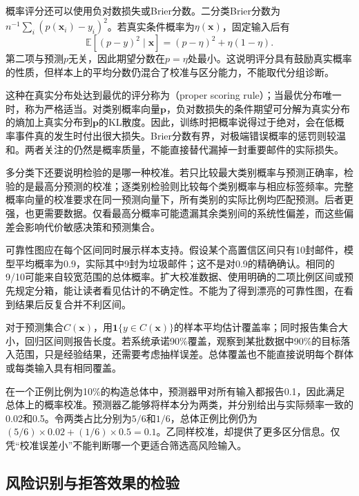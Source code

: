 概率评分还可以使用负对数损失或Brier分数。二分类Brier分数为$n^{-1}\sum_i(p(\bm{x}_i)-y_i)^2$。若真实条件概率为$\eta(\bm{x})$，固定输入后有
\[
 \mathbb E[(p-y)^2\mid\bm{x}]
 =(p-\eta)^2+\eta(1-\eta).
\]
第二项与预测$p$无关，因此期望分数在$p=\eta$处最小。这说明评分具有鼓励真实概率的性质，但样本上的平均分数仍混合了校准与区分能力，不能取代分组诊断。

这种在真实分布处达到最优的评分称为（proper scoring rule）；当最优分布唯一时，称为严格适当。对类别概率向量$\bm p$，负对数损失的条件期望可分解为真实分布的熵加上真实分布到$\bm p$的KL散度。因此，训练时把概率说得过于绝对，会在低概率事件真的发生时付出很大损失。Brier分数有界，对极端错误概率的惩罚则较温和。两者关注的仍然是概率质量，不能直接替代漏掉一封重要邮件的实际损失。

多分类下还要说明检验的是哪一种校准。若只比较最大类别概率与预测正确率，检验的是最高分预测的校准；逐类别检验则比较每个类别概率与相应标签频率。完整概率向量的校准要求在同一预测向量下，所有类别的实际比例均匹配预测。后者更强，也更需要数据。仅看最高分概率可能遗漏其余类别间的系统性偏差，而这些偏差会影响代价敏感决策和预测集合。

可靠性图应在每个区间同时展示样本支持。假设某个高置信区间只有10封邮件，模型平均概率为0.9，实际其中9封为垃圾邮件；这不是对0.9的精确确认。相同的9/10可能来自较宽范围的总体概率。扩大校准数据、使用明确的二项比例区间或预先规定分箱，能让读者看见估计的不确定性。不能为了得到漂亮的可靠性图，在看到结果后反复合并不利区间。

对于预测集合$C(\bm{x})$，用$\mathbf 1\{y\in C(\bm{x})\}$的样本平均估计覆盖率；同时报告集合大小，回归区间则报告长度。若系统承诺90\%覆盖，观察到某批数据中90\%的目标落入范围，只是经验结果，还需要考虑抽样误差。总体覆盖也不能直接说明每个群体或每类输入具有相同覆盖。

\begin{example}[校准与区分能力]
\label{ex:reliability-constant-score}
在一个正例比例为10\%的构造总体中，预测器甲对所有输入都报告0.1，因此满足总体上的概率校准。预测器乙能够将样本分为两类，并分别给出与实际频率一致的0.02和0.5。令两类占比分别为$5/6$和$1/6$，总体正例比例仍为$(5/6)\times0.02+(1/6)\times0.5=0.1$。乙同样校准，却提供了更多区分信息。仅凭“校准误差小”不能判断哪一个更适合筛选高风险输入。
\end{example}

\subsection{风险识别与拒答效果的检验}
\label{sec:reliability-selection-evaluation}

